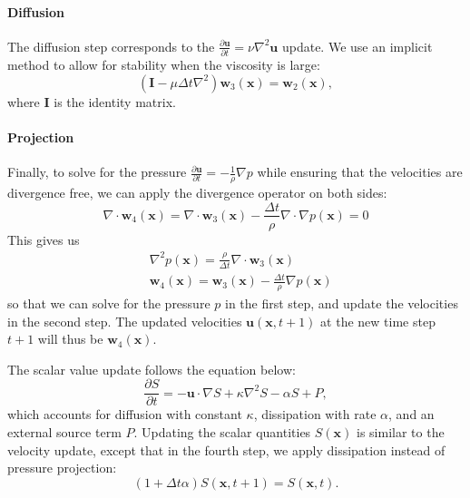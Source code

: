 \documentclass[sigconf]{acmart}
\begin{document}
\paragraph{Diffusion} The diffusion step corresponds to the $\frac{\partial \mathbf{u}}{\partial t} = \nu\nabla^2\mathbf{u}$ update. We use an implicit method to allow for stability when the viscosity is large:
\begin{equation}
  (\mathbf{I} - \mu\Delta t\nabla^2)\mathbf{w}_3(\mathbf{x}) = \mathbf{w}_2(\mathbf{x}),
\end{equation}
where $\mathbf{I}$ is the identity matrix.

\paragraph{Projection} Finally, to solve for the pressure $\frac{\partial \mathbf{u}}{\partial t} = -\frac{1}{\rho}\nabla p$ while ensuring that the velocities are divergence free, we can apply the divergence operator on both sides:
\begin{equation}
  \nabla\cdot\mathbf{w}_4(\mathbf{x}) = \nabla\cdot\mathbf{w}_3(\mathbf{x}) - \frac{\Delta t}{\rho}\nabla\cdot\nabla p(\mathbf{x}) = 0
\end{equation}
This gives us
\begin{equation}
\begin{split}
  &\nabla^2 p(\mathbf{x}) = \frac{\rho}{\Delta t}\nabla\cdot\mathbf{w}_3(\mathbf{x})\\
  &\mathbf{w}_4(\mathbf{x}) = \mathbf{w}_3(\mathbf{x}) - \frac{\Delta t}{\rho}\nabla p(\mathbf{x})
\end{split}
\end{equation}
so that we can solve for the pressure $p$ in the first step, and update the velocities in the second step. The updated velocities $\mathbf{u}(\mathbf{x}, t + 1)$ at the new time step $t + 1$ will thus be $\mathbf{w}_4(\mathbf{x})$.

The scalar value update follows the equation below:
\begin{equation}
  \frac{\partial S}{\partial t} = -\mathbf{u}\cdot\nabla S + \kappa\nabla^2 S - \alpha S + P,
\end{equation}
which accounts for diffusion with constant $\kappa$, dissipation with rate $\alpha$, and an external source term $P$.
Updating the scalar quantities $S(\mathbf{x})$ is similar to the velocity update, except that in the fourth step, we apply dissipation instead of pressure projection:
\begin{equation}
  (1 + \Delta t \alpha)S(\mathbf{x}, t + 1) = S(\mathbf{x}, t).
\end{equation}
\end{document}
